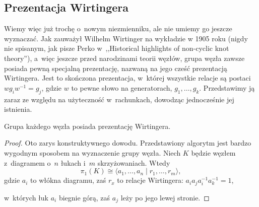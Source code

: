 
\subsection{Prezentacja Wirtingera}
%
Wiemy więc już trochę o~nowym niezmienniku, ale nie umiemy go jeszcze wyznaczać.
Jak zauważył Wilhelm Wirtinger na wykładzie w 1905 roku (nigdy nie spisanym, jak pisze Perko w~,,Historical highlights of non-cyclic knot theory''), a~więc jeszcze przed narodzinami teorii węzłów, grupa węzła zawsze posiada pewną specjalną prezentację, nazwaną na jego cześć prezentacją Wirtingera.
%
Jest to skończona prezentacja, w~której wszystkie relacje są postaci $w g_i w^{-1} = g_j$, gdzie $w$ to pewne słowo na generatorach, $g_1, \ldots, g_k$.
Przedstawimy ją zaraz ze względu na użyteczność w~rachunkach, dowodząc jednocześnie jej istnienia.

\begin{proposition}
    Grupa każdego węzła posiada prezentację Wirtingera.
\end{proposition}

\begin{proof}
    Oto zarys konstruktywnego dowodu.
    Przedstawiony algorytm jest bardzo wygodnym sposobem na wyznaczenie grupy węzła.
    Niech $K$ będzie węzłem z~diagramem o~$n$ łukach i~$m$ skrzyżowaniach.
    Wtedy
    \begin{equation}
        \pi_1(K) \cong \langle a_1, \ldots, a_n \mid r_1, \ldots, r_m\rangle,
    \end{equation}
    gdzie $a_i$ to włókna diagramu, zaś $r_x$ to relacje Wirtingera: $a_ia_ja_i^{-1}a_k^{-1}=1$,
\begin{comment}
    \begin{figure}[H]
    \begin{minipage}[b]{.48\linewidth}
        \[
            \LargeWirtingerRelationA
        \]
    \end{minipage}
    \begin{minipage}[b]{.48\linewidth}
        \[
            \LargeWirtingerRelationB
        \]
    \end{minipage}
    \end{figure}
\end{comment}
    w~których łuk $a_i$ biegnie górą, zaś $a_j$ leży po jego lewej stronie.
\end{proof}


